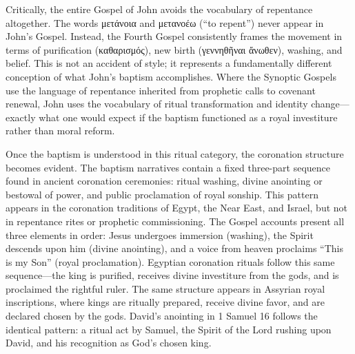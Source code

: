 Critically, the entire Gospel of John avoids the vocabulary of repentance altogether.
The words μετάνοια and μετανοέω (``to repent'') never appear in John's Gospel.
Instead, the Fourth Gospel consistently frames the movement in terms of purification (καθαρισμός), new birth (γεννηθῆναι ἄνωθεν), washing, and belief.
This is not an accident of style; it represents a fundamentally different conception of what John's baptism accomplishes.
Where the Synoptic Gospels use the language of repentance inherited from prophetic calls to covenant renewal, John uses the vocabulary of ritual transformation and identity change---exactly what one would expect if the baptism functioned as a royal investiture rather than moral reform.

Once the baptism is understood in this ritual category, the coronation structure becomes evident.
The baptism narratives contain a fixed three-part sequence found in ancient coronation ceremonies: ritual washing, divine anointing or bestowal of power, and public proclamation of royal sonship.
This pattern appears in the coronation traditions of Egypt, the Near East, and Israel, but not in repentance rites or prophetic commissioning.
The Gospel accounts present all three elements in order: Jesus undergoes immersion (washing), the Spirit descends upon him (divine anointing), and a voice from heaven proclaims ``This is my Son'' (royal proclamation).
Egyptian coronation rituals follow this same sequence---the king is purified, receives divine investiture from the gods, and is proclaimed the rightful ruler.
The same structure appears in Assyrian royal inscriptions, where kings are ritually prepared, receive divine favor, and are declared chosen by the gods.
David's anointing in 1 Samuel 16 follows the identical pattern: a ritual act by Samuel, the Spirit of the Lord rushing upon David, and his recognition as God's chosen king.

